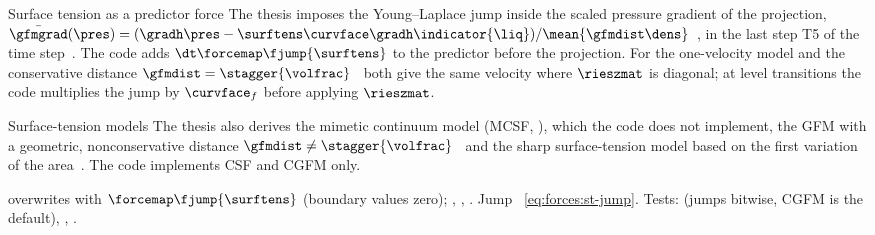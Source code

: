 \begin{deviation}{Surface tension as a predictor force}\label{dev:forces:st-stage}
The thesis imposes the Young--Laplace jump inside the scaled pressure
gradient of the projection, $\bar\gfmgrad(\pres)=(\gradh\pres-\surftens\curvface\gradh\indicator{\liq})/\mean{\gfmdist\dens}$~,
in the last step T5 of the time step~. The code adds
$\dt\forcemap\fjump{\surftens}$ to the predictor before the projection. For the
one-velocity model and the conservative distance
$\gfmdist=\stagger{\volfrac}$~ both give the same
velocity where $\rieszmat$ is diagonal; at level transitions the code
multiplies the jump by $\curvface_f$ before applying $\rieszmat$.
\end{deviation}

\begin{deviation}{Surface-tension models}\label{dev:forces:st-models}
The thesis also derives the mimetic continuum model (MCSF,
), which the code does not implement, the GFM with a
geometric, nonconservative distance
$\gfmdist\neq\stagger{\volfrac}$~ and the sharp
surface-tension model based on the first variation of the
area~. The code implements CSF and CGFM only.
\end{deviation}

\begin{implnote}
overwrites  with $\forcemap\fjump{\surftens}$ (boundary
values zero); , ,
. Jump
~\cref{eq:forces:st-jump}.
Tests: 
(jumps bitwise, CGFM is the default),
,
.
\end{implnote}

